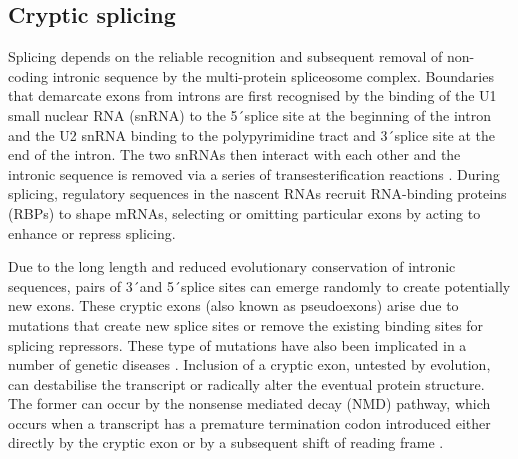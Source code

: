 



%
%
%
%
%





\subsection{Cryptic splicing}
Splicing depends on the reliable recognition and subsequent removal of non-coding intronic sequence by the multi-protein spliceosome complex. Boundaries that demarcate exons from introns are first recognised by the binding of the U1 small nuclear RNA (snRNA) to the 5\'\ splice site at the beginning of the intron and the U2 snRNA binding to the polypyrimidine tract and 3\'\ splice site at the end of the intron. The two snRNAs then interact with each other and the intronic sequence is removed via a series of transesterification reactions  \citep{Matera2014-pu}.  During splicing, regulatory sequences in the nascent RNAs recruit RNA-binding proteins (RBPs) to shape mRNAs, selecting or omitting particular exons by acting to enhance or repress splicing.

Due to the long length and reduced evolutionary conservation of intronic sequences, pairs of 3\'\ and 5\'\ splice sites can emerge randomly to create potentially new exons. These cryptic exons (also known as pseudoexons) arise due to mutations that create new splice sites or remove the existing binding sites for splicing repressors. These type of mutations have also been implicated in a number of genetic diseases \citep{Eng2004-lq, Buratti2007-iz, Vorechovsky2006-wb,Meili2009-hc}. Inclusion of a cryptic exon, untested by evolution, can destabilise the transcript or radically alter the eventual protein structure. The former can occur by the nonsense mediated decay (NMD) pathway, which occurs when a transcript has a premature termination codon introduced either directly by the cryptic exon or by a subsequent shift of reading frame \citep{McGlincy2008-wh}. 

